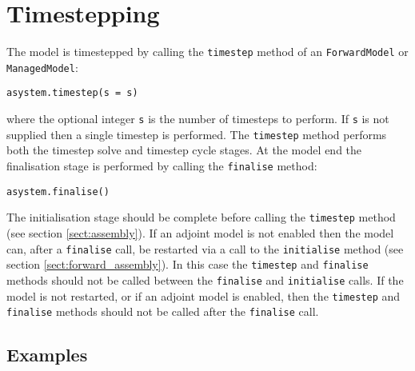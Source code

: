 \documentclass[a4paper]{book}
\begin{document}
\section{Timestepping}\label{sect:timestepping}

The model is timestepped by calling the \verb+timestep+ method of an \linebreak
\verb+ForwardModel+ or \verb+ManagedModel+:
\begin{lstlisting}
asystem.timestep(s = s)
\end{lstlisting}
where the optional integer \verb+s+ is the number of timesteps to perform. If
\verb+s+ is not supplied then a single timestep is performed. The
\verb+timestep+ method performs both the timestep solve and timestep cycle
stages. At the model end the finalisation stage is performed by calling the
\verb+finalise+ method:
\begin{lstlisting}
asystem.finalise()
\end{lstlisting}

The initialisation stage should be complete before calling the \verb+timestep+
method (see section \ref{sect:assembly}). If an adjoint model is not enabled
then the model can, after a \verb+finalise+ call, be restarted via a call to the
\verb+initialise+ method (see section \ref{sect:forward_assembly}). In this case
the \verb+timestep+ and \verb+finalise+ methods should not be called between the
\verb+finalise+ and \verb+initialise+ calls. If the model is not restarted, or
if an adjoint model is enabled, then the \verb+timestep+ and \verb+finalise+
methods should not be called after the \verb+finalise+ call.

\subsection*{Examples}
\end{document}
